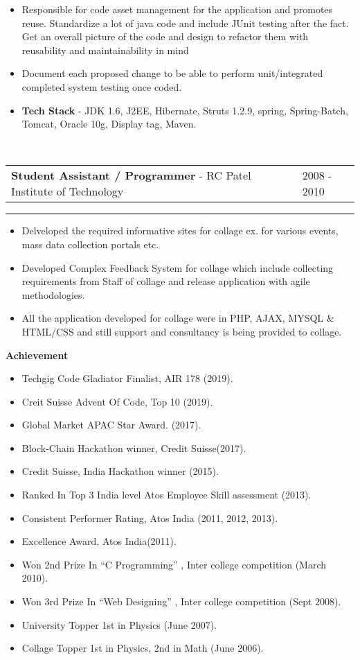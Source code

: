 \documentclass[10pt,A4]{article}
\newcommand{\cvsection}[1]
{
	\begin{center}
		\large\textcolor{sectcol}{\textbf{#1}}
	\end{center}
}
\newcommand{\cvevent}[4]
{

\begin{tabular*}{1\textwidth}{p{13.6cm}  x{3.9cm}}
	\textbf{#2} - \textcolor{bgcol}{#3} &   \vspace{2.0pt}\textcolor{sectcol}{#1}
\end{tabular*}

\vspace{-8pt}
\textcolor{softcol}{\hrule}
\vspace{6pt}

  #4 

}
\begin{document}
{\begin{itemize}
\item Responsible for code asset management for the application and promotes reuse.
Standardize a lot of java code and include JUnit testing after the fact.
Get an overall picture of the code and design to refactor them with reusability and
maintainability in mind
\item Document each proposed change to be able to perform unit/integrated completed
system testing once coded.

\item \textbf{Tech Stack} - JDK 1.6, J2EE, Hibernate, Struts 1.2.9, spring,
Spring-Batch, Tomcat, Oracle 10g, Display tag, Maven.

\end{itemize}
}

\ \\
%
\cvevent{2008 - 2010}
{Student Assistant / Programmer}
{RC Patel Institute of Technology}
{
\begin{itemize}
	\item Delveloped the required informative sites for collage ex. for various events, mass data collection portals etc.
	\item Developed Complex Feedback System for collage which include collecting requirements from Staff of collage and release application with agile methodologies.
	\item All the application developed for collage were in PHP, AJAX, MYSQL \& HTML/CSS and still support and consultancy is being provided to collage.
\end{itemize}

}

\cvsection{Achievement}

\begin{itemize}
\item Techgig Code Gladiator Finalist, AIR 178 (2019).
\item Creit Suisse Advent Of Code, Top 10 (2019).
\item Global Market APAC Star Award. (2017).
\item Block-Chain Hackathon winner, Credit Suisse(2017).
\item Credit Suisse, India Hackathon winner (2015).
\item Ranked In Top 3 India level Atos Employee Skill assessment (2013).
\item Consistent Performer Rating, Atos India (2011, 2012, 2013).
\item Excellence Award, Atos India(2011).
\item Won 2nd Prize In “C Programming” , Inter college competition (March 2010).
\item Won 3rd Prize In “Web Designing” , Inter college competition (Sept 2008).
\item University Topper 1st in Physics (June 2007).
\item Collage Topper 1st in Physics, 2nd in Math (June 2006).
\end{itemize}
\end{document}
